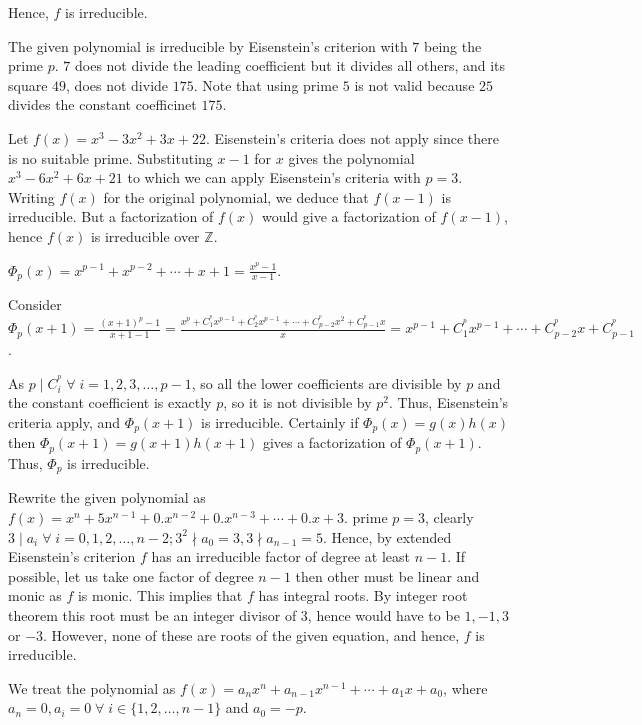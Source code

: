   Hence, $f$ is irreducible.
\item The given polynomial is irreducible by Eisenstein's criterion with $7$ being the prime $p$. $7$ does
  not divide the leading coefficient but it divides all others, and its square $49$, does not divide
  $175$. Note that using prime $5$ is not valid because $25$ divides the constant coefficinet $175$.
\item Let $f(x) = x^3 - 3x^2 + 3x + 22$. Eisenstein's criteria does not apply since there is no suitable
  prime. Substituting $x - 1$ for $x$ gives the polynomial $x^3 - 6x^2 + 6x + 21$ to which we can apply
  Eisenstein's criteria with $p = 3$. Writing $f(x)$ for the original polynomial, we deduce that $f(x - 1)$
  is irreducible. But a factorization of $f(x)$ would give a factorization of $f(x - 1)$, hence $f(x)$ is
  irreducible over $\mathbb{Z}$.
\item $\Phi_p(x) = x^{p - 1} + x^{p - 2} + \cdots + x + 1 = \frac{x^p - 1}{x - 1}$.

  Consider $\Phi_p(x + 1) = \frac{(x + 1)^p - 1}{x + 1 - 1} = \frac{x^p + C_1^^px^{p - 1} + C_2^^px^{p - 1} +
    \cdots + C_{p - 2}^^px^2 + C_{p - 1}^^p{x}}{x} = x^{p - 1} + C_1^^px^{p - 1} + \cdots + C_{p - 2}^^px + C_{p - 1}^^p$.

  As $p\mid C_i^^p\;\forall\; i = 1, 2, 3,\ldots, p - 1$, so all the lower coefficients are divisible by $p$ and
  the constant coefficient is exactly $p$, so it is not divisible by $p^2$. Thus, Eisenstein's criteria apply,
  and $\Phi_p(x + 1)$ is irreducible. Certainly if $\Phi_p(x) = g(x)h(x)$ then $\Phi_p(x + 1) = g(x + 1)h(x
  + 1)$ gives a factorization of $\Phi_p(x + 1)$. Thus, $\Phi_p$ is irreducible.
\item Rewrite the given polynomial as $f(x) = x^n + 5x^{n - 1} + 0.x^{n - 2} + 0.x^{n- 3} + \cdots + 0.x + 3$.
  prime $p = 3$, clearly $3\mid a_i\;\forall\; i = 0, 1, 2, \ldots,  n - 2; 3^2\nmid a_0 = 3,
  3\nmid a_{n - 1} = 5$. Hence, by extended Eisenstein's criterion $f$ has an irreducible factor of degree
  at least $n - 1$. If possible, let us take one factor of degree $n - 1$ then other must be linear and
  monic as $f$ is monic. This implies that $f$ has integral roots. By integer root theorem this root must be
  an integer divisor of $3$, hence would have to be $1, -1, 3$ or $-3$. However, none of these are roots of
  the given equation, and hence, $f$ is irreducible.
\item We treat the polynomial as $f(x) = a_nx^n + a_{n - 1}x^{n - 1} + \cdots + a_1x + a_0$, where $a_n = 0,
  a_i = 0\;\forall\;i\in\{1, 2, \ldots, n - 1\}$ and $a_0 = -p$.

